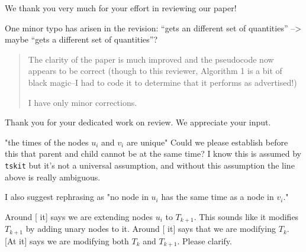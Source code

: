 We thank you very much for your effort in reviewing our paper!

\begin{point}{\revref}
	One minor typo has arisen in the revision:
    ``gets an different set of quantities'' --> maybe ``gets a different set of quantities''?
\end{point}





\begin{quote}
The clarity of the paper is much improved and the pseudocode now appears to
be correct (though to this reviewer, Algorithm 1 is a bit of black
magic--I had to code it to determine that it performs as advertised!)

I have only minor corrections.
\end{quote}

Thank you for your dedicated work on review. We appreciate your input.

\begin{point}{\revref} %
    "the times of the nodes ${u_i}$ and ${v_i}$ are unique"
	Could we please establish before this that parent and child cannot be at the same
	time? I know this is assumed by \texttt{tskit} but it's not a universal assumption, and
	without this assumption the line above is really ambiguous.
	
	I also suggest rephrasing as "no node in ${u_i}$ has the same time as a node in ${v_i}$."
\end{point}


\begin{point}{\revref}
    Around [\revref{} it]
    says we are extending nodes ${u_i}$ to $T_{k+1}$. This sounds like it
	modifies $T_{k+1}$ by adding unary nodes to it.
    Around %
    [ it]
    says that we are modifying $T_k$.
    [At  it]
    says we are modifying both $T_k$ and $T_{k+1}$. Please clarify.
\end{point}

